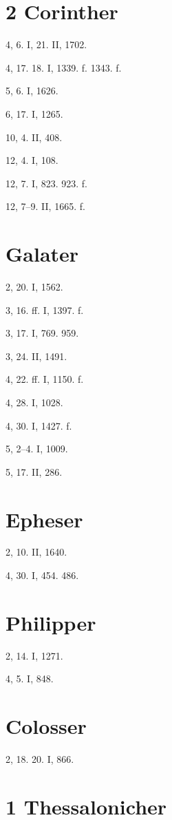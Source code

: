 \section{2 Corinther}

4, 6. I, 21. II, 1702.

4, 17. 18. I, 1339. f. 1343. f.

5, 6. I, 1626.

6, 17. I, 1265.

10, 4. II, 408.

12, 4. I, 108.

12, 7. I, 823. 923. f.

12, 7–9. II, 1665. f.

\section{Galater}

2, 20. I, 1562.

3, 16. ff. I, 1397. f.

3, 17. I, 769. 959.

3, 24. II, 1491.

4, 22. ff. I, 1150. f.

4, 28. I, 1028.

4, 30. I, 1427. f.

5, 2–4. I, 1009.

5, 17. II, 286.

\section{Epheser}

2, 10. II, 1640.

4, 30. I, 454. 486.

\section{Philipper}

2, 14. I, 1271.

4, 5. I, 848.

\section{Colosser}

2, 18. 20. I, 866.

\section{1 Thessalonicher}

